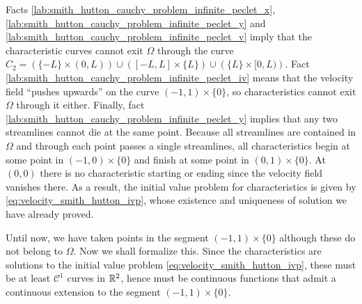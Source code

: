 Facts \ref{lab:smith_hutton_cauchy_problem_infinite_peclet_x},
\ref{lab:smith_hutton_cauchy_problem_infinite_peclet_y} and
\ref{lab:smith_hutton_cauchy_problem_infinite_peclet_v} imply that the
characteristic curves cannot exit $\Omega$ through the curve
$C_2 = \left( \{ -L \} \times (0,L) \right) \cup \left( [-L,L] \times \{ L \}
\right) \cup \left( \{ L \} \times [0,L) \right)$. Fact
\ref{lab:smith_hutton_cauchy_problem_infinite_peclet_iv} means that the
velocity field ``pushes upwards'' on the curve $(-1,1) \times \{ 0 \}$, so
characteristics cannot exit $\Omega$ through it either. Finally, fact
\ref{lab:smith_hutton_cauchy_problem_infinite_peclet_y} implies that any two
streamlines cannot die at the same point. Because all streamlines are contained
in $\Omega$ and through each point passes a single streamlines, all
characteristics begin at some point in $(-1,0) \times \{ 0 \}$ and finish at
some point in $(0,1) \times \{ 0 \}$. At $(0,0)$ there is no characteristic
starting or ending since the velocity field vanishes there. As a result, the
initial value problem for characteristics is given by
\eqref{eq:velocity_smith_hutton_ivp}, whose existence and uniqueness of solution
we have already proved. 

Until now, we have taken points in the segment $(-1,1) \times \{ 0 \}$ although
these do not belong to $\Omega$. Now we shall formalize this. Since the
characteristics are solutions to the initial value problem
\eqref{eq:velocity_smith_hutton_ivp}, these must be at least $\mathcal{C}^1$
curves in $\mathbb{R}^2$, hence must be continuous functions that admit a continuous
extension to the segment $(-1,1) \times \{ 0 \}$.

